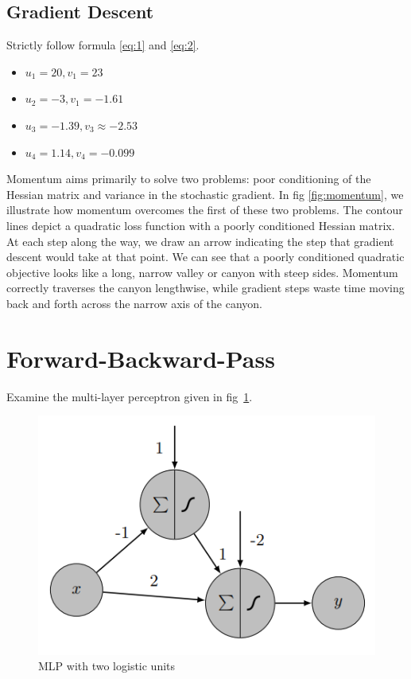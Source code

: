 \documentclass[12pt]{article}
\providecommand{\tightlist}{%
	\setlength{\itemsep}{0pt}\setlength{\parskip}{0pt}}
\begin{document}
\subsection{Gradient Descent}

Strictly follow formula \ref{eq:1} and \ref{eq:2}.

\begin{itemize}
	\tightlist
	\item $u_1=20, v_1=23$
	\item $u_2=-3, v_1=-1.61$
	\item $u_3=-1.39, v_3\approx -2.53$
	\item $u_4=1.14,v_4=-0.099$
\end{itemize}

Momentum aims primarily to solve two problems: poor conditioning of the Hessian matrix and variance in the stochastic gradient. In fig \ref{fig:momentum}, we illustrate how momentum overcomes the first of these two problems. The contour lines depict a quadratic loss function with a poorly conditioned Hessian matrix.  At each step along the way, we draw an arrow indicating the step that gradient descent would take at that point. We can see that a poorly conditioned quadratic objective looks like a long, narrow valley or canyon with steep sides. Momentum correctly traverses the canyon lengthwise, while gradient steps waste time moving back and forth across the narrow axis of the canyon.

\newpage 
\section{Forward-Backward-Pass}
Examine the multi-layer perceptron given in fig~\ref{fig:mlp}.

\begin{figure}[!htbp]
	\centering
	\includegraphics[width=.5\textwidth]{fig/2018-03-19-13-49-49.png}
	\caption{MLP with two logistic units} \label{fig:mlp}
\end{figure}
\end{document}
